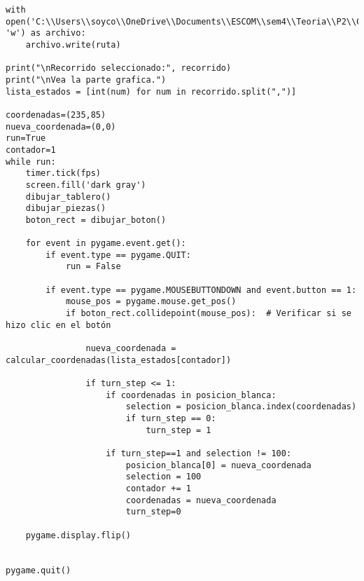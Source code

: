 \begin{lstlisting}
with open('C:\\Users\\soyco\\OneDrive\\Documents\\ESCOM\\sem4\\Teoria\\P2\\Chess\\output\\ruta_blanca.txt', 'w') as archivo:
    archivo.write(ruta)

print("\nRecorrido seleccionado:", recorrido)
print("\nVea la parte grafica.")
lista_estados = [int(num) for num in recorrido.split(",")]

coordenadas=(235,85)
nueva_coordenada=(0,0)
run=True
contador=1
while run:
    timer.tick(fps)
    screen.fill('dark gray')
    dibujar_tablero()
    dibujar_piezas()
    boton_rect = dibujar_boton()

    for event in pygame.event.get():
        if event.type == pygame.QUIT:
            run = False

        if event.type == pygame.MOUSEBUTTONDOWN and event.button == 1:
            mouse_pos = pygame.mouse.get_pos()
            if boton_rect.collidepoint(mouse_pos):  # Verificar si se hizo clic en el botón
                
                nueva_coordenada = calcular_coordenadas(lista_estados[contador])
                
                if turn_step <= 1:
                    if coordenadas in posicion_blanca:
                        selection = posicion_blanca.index(coordenadas)
                        if turn_step == 0:
                            turn_step = 1
                        
                    if turn_step==1 and selection != 100:
                        posicion_blanca[0] = nueva_coordenada
                        selection = 100
                        contador += 1
                        coordenadas = nueva_coordenada
                        turn_step=0

    pygame.display.flip()


pygame.quit()

\end{lstlisting}


